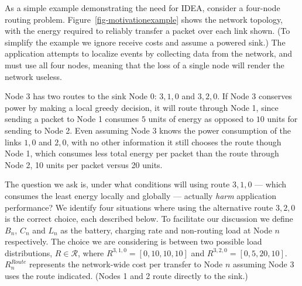 As a simple example demonstrating the need for IDEA, consider a four-node
routing problem.  Figure~\ref{fig-motivationexample} shows the network
topology, with the energy required to reliably transfer a packet over each
link shown. (To simplify the example we ignore receive costs and assume a
powered sink.) The application attempts to localize events by collecting data
from the network, and must use all four nodes, meaning that the loss of a
single node will render the network useless.

Node 3 has two routes to the sink Node 0: $3,1,0$ and $3,2,0$. If Node 3
conserves power by making a local greedy decision, it will route through Node
1, since sending a packet to Node 1 consumes $5$ units of energy as opposed
to $10$ units for sending to Node 2. Even assuming Node 3 knows the power
consumption of the links $1,0$ and $2,0$, with no other information it still
chooses the route though Node 1, which consumes less total energy per packet
than the route through Node 2, 10 units per packet versus 20 units.

The question we ask is, under what conditions will using route $3,1,0$ ---
which consumes the least energy locally and globally --- actually
\textit{harm} application performance?  We identify four situations where
using the alternative route $3,2,0$ is the correct choice, each described
below. To facilitate our discussion we define $B_n$, $C_n$ and $L_n$ as the
battery, charging rate and non-routing load at Node $n$ respectively. The
choice we are considering is between two possible load distributions, $R \in
\mathcal{R}$, where $R^{3,1,0} = [0, 10, 10, 10]$ and $R^{3,2,0} = [0, 5, 20,
10]$.  $R^{Route}_n$ represents the network-wide cost per transfer to Node
$n$ assuming Node 3 uses the route indicated.  (Nodes 1 and 2 route directly
to the sink.)

